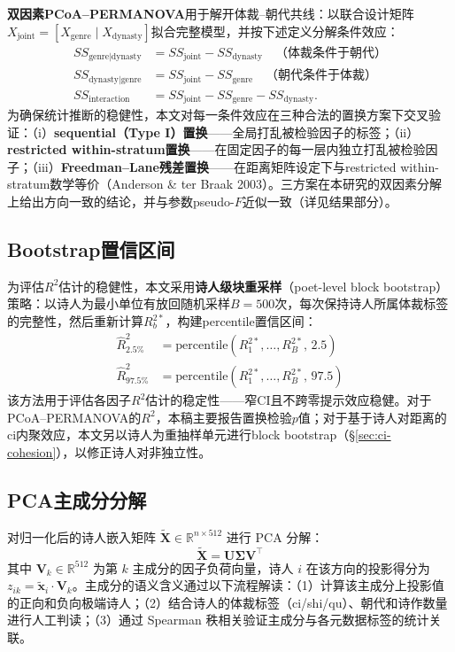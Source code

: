 \documentclass[12pt,a4paper]{article}
\numberwithin{equation}{section}
\begin{document}
\textbf{双因素PCoA--PERMANOVA}用于解开体裁--朝代共线：以联合设计矩阵$X_{\text{joint}}=[X_{\text{genre}}\mid X_{\text{dynasty}}]$拟合完整模型，并按下述定义分解条件效应：
\begin{align}
SS_{\text{genre}\mid\text{dynasty}}    &= SS_{\text{joint}} - SS_{\text{dynasty}} \quad\text{（体裁条件于朝代）}\\
SS_{\text{dynasty}\mid\text{genre}}    &= SS_{\text{joint}} - SS_{\text{genre}}   \quad\text{（朝代条件于体裁）}\\
SS_{\text{interaction}}                &= SS_{\text{joint}} - SS_{\text{genre}} - SS_{\text{dynasty}}.
\end{align}
为确保统计推断的稳健性，本文对每一条件效应在三种合法的置换方案下交叉验证：（i）\textbf{sequential（Type I）置换}——全局打乱被检验因子的标签；（ii）\textbf{restricted within-stratum置换}——在固定因子的每一层内独立打乱被检验因子；（iii）\textbf{Freedman--Lane残差置换}——在距离矩阵设定下与restricted within-stratum数学等价（Anderson \& ter Braak 2003）。三方案在本研究的双因素分解上给出方向一致的结论，并与参数pseudo-$F$近似一致（详见结果部分）。

\subsection{Bootstrap置信区间}

为评估$R^{2}$估计的稳健性，本文采用\textbf{诗人级块重采样}（poet-level block bootstrap）策略：以诗人为最小单位有放回随机采样$B=500$次，每次保持诗人所属体裁标签的完整性，然后重新计算$R^{2*}_b$，构建percentile置信区间：
\begin{align}
\hat{R}^{2}_{2.5\%}  &= \text{percentile}(R^{2*}_{1},\ldots,R^{2*}_{B},\,2.5)\\
\hat{R}^{2}_{97.5\%} &= \text{percentile}(R^{2*}_{1},\ldots,R^{2*}_{B},\,97.5)
\end{align}
该方法用于评估各因子$R^{2}$估计的稳定性——窄CI且不跨零提示效应稳健。对于PCoA--PERMANOVA的$R^{2}$，本稿主要报告置换检验$p$值；对于基于诗人对距离的ci内聚效应，本文另以诗人为重抽样单元进行block bootstrap（§\ref{sec:ci-cohesion}），以修正诗人对非独立性。

\subsection{PCA主成分分解}

对归一化后的诗人嵌入矩阵 $\tilde{\mathbf{X}}\in\mathbb{R}^{n\times512}$ 进行 PCA 分解：
\begin{equation}
\tilde{\mathbf{X}} = \mathbf{U}\mathbf{\Sigma}\mathbf{V}^{\top}
\end{equation}
其中 $\mathbf{V}_k\in\mathbb{R}^{512}$ 为第 $k$ 主成分的因子负荷向量，诗人 $i$ 在该方向的投影得分为 $z_{ik}=\tilde{\mathbf{x}}_i\cdot\mathbf{V}_k$。主成分的语义含义通过以下流程解读：（1）计算该主成分上投影值的正向和负向极端诗人；（2）结合诗人的体裁标签（ci/shi/qu）、朝代和诗作数量进行人工判读；（3）通过 Spearman 秩相关验证主成分与各元数据标签的统计关联。
\end{document}
